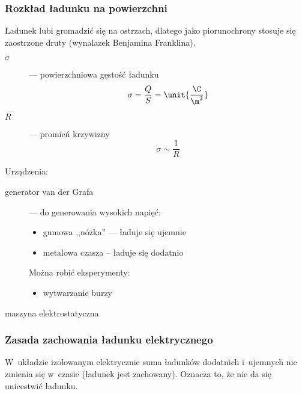 \subsubsection{Rozkład ładunku na powierzchni}
Ładunek lubi gromadzić się na ostrzach, dlatego jako piorunochrony stosuje się zaostrzone druty (wynalazek Benjamina Franklina).
\begin{description}
    \item[\(\sigma\)] --- powierzchniowa gęstość ładunku
        \begin{equation*}
            \sigma = \frac{Q}{S} = \unit{\frac{\C}{\m^2}}
        \end{equation*}
    \item[\(R\)] --- promień krzywizny
        \begin{equation*}
            \sigma \sim \frac{1}{R}
        \end{equation*}
\end{description}
Urządzenia:
\begin{description}
    \item[generator van der Grafa] --- do generowania wysokich napięć:
        \begin{itemize}
            \item gumowa ,,nóżka'' --- ładuje się ujemnie
            \item metalowa czasza -- ładuje się dodatnio
        \end{itemize}
        Można robić eksperymenty:
        \begin{itemize}
            \item wytwarzanie burzy
        \end{itemize}
    \item[maszyna elektrostatyczna]
\end{description}
\subsubsection*{Zasada zachowania ładunku elektrycznego}
W~układzie izolowanym elektrycznie suma ładunków dodatnich i~ujemnych nie zmienia się w~czasie (ładunek jest zachowany). Oznacza to, że nie da się unicestwić ładunku.
